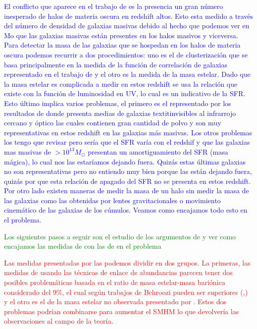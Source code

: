\textcolor{blue}{El conflicto que aparece en el trabajo de \cite{steinhardt2016impossibly} es la presencia un gran número inesperado de halos de materia oscura en redshift altos. Esto esta medido a través del número de densidad de galaxias masivas debido al hecho que podemos ver en Mo que las galaxias masivas están presentes en los halos masivos y viceversa. Para detectar la masa de las galaxias que se hospedan en los halos de materia oscura podemos recurrir a dos procedimientos: uno es el de clusterización que se basa principalmente en la medida de la función de correlación de galaxias representado en el trabajo de \cite{hildebrandt2009cars} y el otro es la medida de la masa estelar. Dado que la masa estelar es complicada a medir en estos redshift se usa la relación que existe con la función de luminosidad en UV, lo cual es un indicativo de la SFR. Esto último implica varios problemas, el primero es el representado por los resultados de \cite{wang2019dominant} donde presenta medias de galaxias textit{invisibles} al infrarrojo cercano y óptico las cuales contienen gran cantidad de polvo y son muy representativas en estos redshift en las galaxias más masivas. Los otros problemas los tengo que revisar pero sería que el SFR varía con el redshif y que las galaxias mas masivas de $>10^{13}M_{\odot}$ presentan un amortiguamiento del SFR (masa mágica), lo cual nos las estaríamos dejando fuera. Quizás estas últimas galaxias no son representativas pero no entiendo muy bien porque las están dejando fuera, quizás por que esta relación de apagado del SFR no se presenta en estos redshift}.\\

\textcolor{blue}{Por otro lado existen maneras de medir la masa de un halo sin medir la masa de las galaxias como las obtenidas por lentes gravitacionales o movimiento cinemático de las galaxias de los cúmulos. Veamos como encajamos todo esto en el problema.}

\textcolor{green}{Los siguientes pasos a seguir son el estudio de los argumentos de \cite{behroozi2018mostmassive} y ver como encajamos las medidas de \cite{wang2019dominant} con las de \cite{behroozi2019universemachine} en el problema}

\textcolor{red}{Las medidas presentadas por \cite{steinhardt2016impossibly} las podemos dividir en dos grupos. La primeras, las medidas de \cite{bouwens2015uv} usando las técnicas de enlace de abundancias parecen tener dos posibles problemáticas basada en el ratio de masa estelar-masa bariónica considerado del 9\%, el cual según trabajos de Behroozi pueden ser superiores (\cite{behroozi2018mostmassive},\cite{behroozi2019universemachine}) y el otro es el de la masa estelar no observada presentado por \cite{wang2019dominant}. Estos dos problemas podrían combinarse para aumentar el SMHM lo que devolvería  las observaciones al campo de la teoría.} \\

